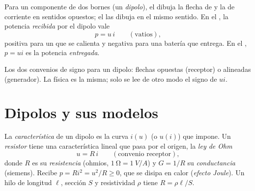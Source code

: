 \begin{notation}\label{not:b1:dc-circuits:conventions}
Para un componente de dos bornes (un \emph{dipolo}), el \emph{} dibuja la flecha de  y la de corriente en sentidos
opuestos; el \emph{} las dibuja en el mismo sentido. En
el , la potencia \emph{recibida} por el dipolo vale
\[
p = u\,i \qquad (\text{vatios}),
\]
positiva para un  que se calienta y negativa para una batería que
entrega. En el , $p = ui$ es la potencia
\emph{entregada}.
\end{notation}

\begin{omfigure}

{\small Los dos convenios de signo para un dipolo: flechas opuestas
(receptor) o alineadas (generador). La física es la misma; solo se lee de
otro modo el signo de $ui$.}
\end{omfigure}

\section{Dipolos y sus modelos}

\begin{definition}\label{def:b1:dc-circuits:resistor}
La \emph{característica} de un dipolo es la curva $i(u)$ (o $u(i)$) que
impone. Un \emph{resistor} tiene una característica lineal que pasa por el
origen, la \emph{ley de Ohm}
\[
u = R\,i \qquad (\text{convenio receptor}),
\]
donde $R$ es su \emph{resistencia} (ohmios, $\qty{1}{\ohm} = \qty{1}{V/A}$) y
$G = 1/R$ su \emph{conductancia} (siemens). Recibe $p = Ri^2 =
u^2/R \geq 0$, que se disipa en calor (\emph{efecto Joule}). Un hilo de
longitud $\ell$, sección $S$ y resistividad $\rho$ tiene
$R = \rho\ell/S$.
\end{definition}

